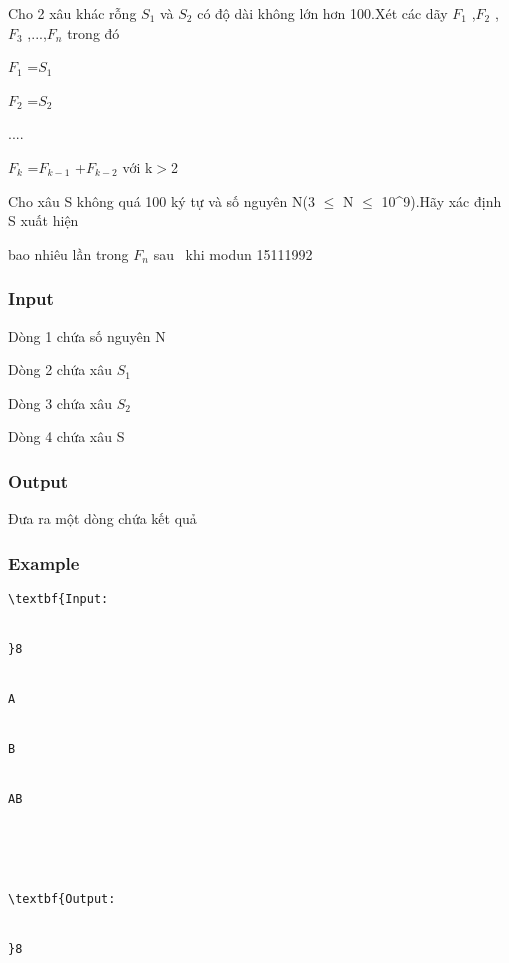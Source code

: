 



   Cho 2 xâu khác rỗng $S_{1}$   và $S_{2}$   có độ dài không lớn hơn 100.Xét các dãy $F_{1}$   ,$F_{2}$   ,$F_{3}$   ,...,$F_{n}$   trong đó   


   $F_{1}$   =$S_{1}$


   $F_{2}$   =$S_{2}$


   ....   


   $F_{k}$   =$F_{k-1}$   +$F_{k-2}$   với k$>$2   


   Cho xâu S không quá 100 ký tự và số nguyên N(3 $\le$ N $\le$ 10^9).Hãy xác định S xuất hiện   


   bao nhiêu lần trong $F_{n}$   sau  khi modun 15111992   










\subsubsection{   Input  }

   Dòng 1 chứa số nguyên N  

   Dòng 2 chứa xâu $S_{1}$

   Dòng 3 chứa xâu $S_{2}$

   Dòng 4 chứa xâu S  

\subsubsection{   Output  }

   Đưa ra một dòng chứa kết quả  

\subsubsection{   Example  }
\begin{verbatim}
\textbf{Input:


}8


A


B


AB





\textbf{Output:


}8 \end{verbatim}
